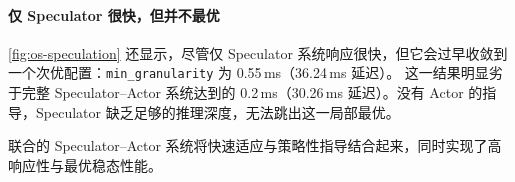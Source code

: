 \paragraph{仅 Speculator 很快，但并不最优}
\cref{fig:os-speculation} 还显示，尽管仅 Speculator 系统响应很快，但它会过早收敛到一个次优配置：\texttt{min\_granularity} 为 0.55\,ms（36.24\,ms 延迟）。
这一结果明显劣于完整 Speculator--Actor 系统达到的 0.2\,ms（30.26\,ms 延迟）。没有 Actor 的指导，Speculator 缺乏足够的推理深度，无法跳出这一局部最优。

联合的 Speculator--Actor 系统将快速适应与策略性指导结合起来，同时实现了高响应性与最优稳态性能。

